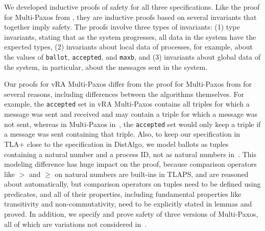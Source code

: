 \documentclass[11pt]{article}
\begin{document}
We developed inductive proofs of safety for all three specifications. %
%
Like the proof for Multi-Paxos from \cite{Cha+16PaxosTLAPS-FM}, they are
inductive proofs based on several invariants that together imply safety.
The proofs involve three types of invariants: (1) type invariants, stating
that as the system progresses, all data in the system have the expected
types, (2) invariants about local data of processes, for example, about the
values of \texttt{ballot}, \texttt{accepted}, and \texttt{maxb}, and (3)
invariants about global data of the system, in particular, about the
messages sent in the system.

Our proofs for vRA Multi-Paxos differ from the proof for Multi-Paxos from
\cite{Cha+16PaxosTLAPS-FM} for several reasons, including differences
between the algorithms themselves.  For example, the \texttt{accepted} set
in vRA Multi-Paxos contains all triples for which a  message was
sent and received and may contain a triple for which a  message was not sent, whereas in Multi-Paxos in~\cite{Cha+16PaxosTLAPS-FM}, the \texttt{accepted} set would only keep a triple if a  message was sent containing that triple.
Also, to keep our specification in TLA+ close to the specification in
DistAlgo, we model ballots as tuples containing a natural number and a
process ID, not as natural numbers in~\cite{Cha+16PaxosTLAPS-FM}. This
modeling difference has huge impact on the proof, because comparison
operators like $>$ and $\geq$ on natural numbers are built-ins in TLAPS,
and are reasoned about automatically, but comparison operators on tuples need to be defined using predicates, and all of their properties, including fundamental properties like transitivity and non-commutativity, need to be explicitly stated in lemmas and proved.
In addition, we specify and prove safety of three versions of Multi-Paxos, all of which are variations not considered in~\cite{Cha+16PaxosTLAPS-FM}.
\end{document}
